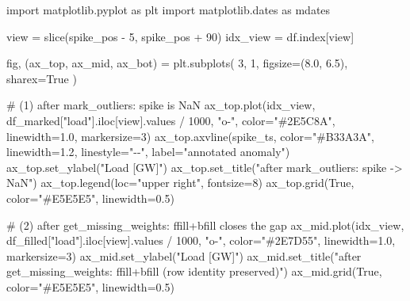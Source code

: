 \documentclass[
  english,
  letterpaper,
]{scrbook}
\newenvironment{Shaded}{\begin{snugshade}}{\end{snugshade}}
\newcommand{\BuiltInTok}[1]{\textcolor[rgb]{0.00,0.23,0.31}{#1}}
\newcommand{\CommentTok}[1]{\textcolor[rgb]{0.37,0.37,0.37}{#1}}
\newcommand{\DecValTok}[1]{\textcolor[rgb]{0.68,0.00,0.00}{#1}}
\newcommand{\FloatTok}[1]{\textcolor[rgb]{0.68,0.00,0.00}{#1}}
\newcommand{\ImportTok}[1]{\textcolor[rgb]{0.00,0.46,0.62}{#1}}
\newcommand{\NormalTok}[1]{\textcolor[rgb]{0.00,0.23,0.31}{#1}}
\newcommand{\OperatorTok}[1]{\textcolor[rgb]{0.37,0.37,0.37}{#1}}
\newcommand{\StringTok}[1]{\textcolor[rgb]{0.13,0.47,0.30}{#1}}
\newcommand{\VariableTok}[1]{\textcolor[rgb]{0.07,0.07,0.07}{#1}}
\begin{document}
\begin{Shaded}
\begin{Highlighting}[]
\ImportTok{import}\NormalTok{ matplotlib.pyplot }\ImportTok{as}\NormalTok{ plt}
\ImportTok{import}\NormalTok{ matplotlib.dates }\ImportTok{as}\NormalTok{ mdates}

\NormalTok{view }\OperatorTok{=} \BuiltInTok{slice}\NormalTok{(spike\_pos }\OperatorTok{{-}} \DecValTok{5}\NormalTok{, spike\_pos }\OperatorTok{+} \DecValTok{90}\NormalTok{)}
\NormalTok{idx\_view }\OperatorTok{=}\NormalTok{ df.index[view]}

\NormalTok{fig, (ax\_top, ax\_mid, ax\_bot) }\OperatorTok{=}\NormalTok{ plt.subplots(}
    \DecValTok{3}\NormalTok{, }\DecValTok{1}\NormalTok{, figsize}\OperatorTok{=}\NormalTok{(}\FloatTok{8.0}\NormalTok{, }\FloatTok{6.5}\NormalTok{), sharex}\OperatorTok{=}\VariableTok{True}
\NormalTok{)}

\CommentTok{\# (1) after mark\_outliers: spike is NaN}
\NormalTok{ax\_top.plot(idx\_view, df\_marked[}\StringTok{"load"}\NormalTok{].iloc[view].values }\OperatorTok{/} \DecValTok{1000}\NormalTok{,}
            \StringTok{"o{-}"}\NormalTok{, color}\OperatorTok{=}\StringTok{"\#2E5C8A"}\NormalTok{, linewidth}\OperatorTok{=}\FloatTok{1.0}\NormalTok{, markersize}\OperatorTok{=}\DecValTok{3}\NormalTok{)}
\NormalTok{ax\_top.axvline(spike\_ts, color}\OperatorTok{=}\StringTok{"\#B33A3A"}\NormalTok{, linewidth}\OperatorTok{=}\FloatTok{1.2}\NormalTok{,}
\NormalTok{               linestyle}\OperatorTok{=}\StringTok{"{-}{-}"}\NormalTok{, label}\OperatorTok{=}\StringTok{"annotated anomaly"}\NormalTok{)}
\NormalTok{ax\_top.set\_ylabel(}\StringTok{"Load [GW]"}\NormalTok{)}
\NormalTok{ax\_top.set\_title(}\StringTok{"after \textasciigrave{}mark\_outliers\textasciigrave{}: spike {-}\textgreater{} NaN"}\NormalTok{)}
\NormalTok{ax\_top.legend(loc}\OperatorTok{=}\StringTok{"upper right"}\NormalTok{, fontsize}\OperatorTok{=}\DecValTok{8}\NormalTok{)}
\NormalTok{ax\_top.grid(}\VariableTok{True}\NormalTok{, color}\OperatorTok{=}\StringTok{"\#E5E5E5"}\NormalTok{, linewidth}\OperatorTok{=}\FloatTok{0.5}\NormalTok{)}

\CommentTok{\# (2) after get\_missing\_weights: ffill+bfill closes the gap}
\NormalTok{ax\_mid.plot(idx\_view, df\_filled[}\StringTok{"load"}\NormalTok{].iloc[view].values }\OperatorTok{/} \DecValTok{1000}\NormalTok{,}
            \StringTok{"o{-}"}\NormalTok{, color}\OperatorTok{=}\StringTok{"\#2E7D55"}\NormalTok{, linewidth}\OperatorTok{=}\FloatTok{1.0}\NormalTok{, markersize}\OperatorTok{=}\DecValTok{3}\NormalTok{)}
\NormalTok{ax\_mid.set\_ylabel(}\StringTok{"Load [GW]"}\NormalTok{)}
\NormalTok{ax\_mid.set\_title(}\StringTok{"after \textasciigrave{}get\_missing\_weights\textasciigrave{}: ffill+bfill (row identity preserved)"}\NormalTok{)}
\NormalTok{ax\_mid.grid(}\VariableTok{True}\NormalTok{, color}\OperatorTok{=}\StringTok{"\#E5E5E5"}\NormalTok{, linewidth}\OperatorTok{=}\FloatTok{0.5}\NormalTok{)}


\end{Highlighting}
\end{Shaded}
\end{document}
